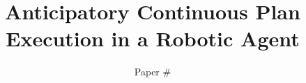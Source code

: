\documentclass[a4paper]{article}
\begin{document}
\title{Anticipatory Continuous Plan Execution in a Robotic Agent}
\author{Paper \#}
\maketitle{}

\begin{abstract}

\end{abstract}




 
%







\twocolumn 


\end{document}
